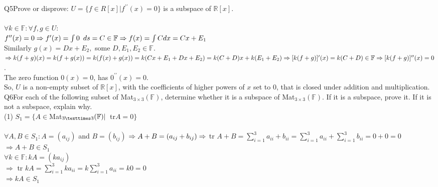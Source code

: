 \documentclass{article}
\begin{document}
Q5\quad Prove or disprove:
$U = \{f ∈ R[x] | f^{\prime\prime}(x)= 0\}$
is a subspace of $\mathbb{R}[x]$.\\

\\
$\forall k \in \mathbb{F}: \forall f,g \in U:$\\
$f^{\prime\prime}(x)= 0 \Rightarrow f^{\prime}(x) = \int 0\enskip ds =
C \in \mathbb{F} \Rightarrow f(x) = \int C dx = Cx + E_1 $\\
Similarly $g(x) = Dx +E_2,$ some $ D,E_1,E_2 \in \mathbb{F}$.\\

$\Rightarrow k(f+g) (x) = k(f+g(x)) = k(f(x) +g(x))
\\ = k(Cx + E_1 + Dx + E_2) = k(C+D) x +k(E_1 + E_2)\\ \Rightarrow
[k(f+g)]^{\prime} (x) = k(C+D) \in \mathbb{F} \Rightarrow
[k(f+g)]^{\prime\prime}(x) = 0$.\\

The zero function $0(x) = 0$, has $0^{\prime\prime}(x) = 0$.\\

So, $U$ is a non-empty subset of $\mathbb{R}[x]$, with the
coefficients of higher powers of $x$ set to $0$, that is closed under
addition and multiplication.\blacksquare\\
\newpage
Q6\quad For each of the following subset of Mat$_{3×3}(\mathbb{F})$, determine whether
it is a subspace of Mat$_{3×3}(\mathbb{F})$. If it is a subspace,
prove it. If it is not a subspace, explain why.\\

(1) $S_1 = \{A \in $Mat$_{3×3}(\mathbb{F}) |\enskip $tr$ A = 0\}$\\

\\
$\forall A,B \in S_1: A = (a_{ij})$ and $B = (b_{ij})$
$\Rightarrow A + B = (a_{ij} + b_{ij}) \\
\Rightarrow$ tr $A + B =  \sum_{i=1}^3 a_{ii} + b_{ii} = \sum_{i=1}^3
a_{ii} + \sum_{i=1}^3 b_{ii} = 0 + 0 = 0$\\
$\Rightarrow A + B \in S_1$\\

$\forall k \in \mathbb{F}: kA = (ka_{ij})$\\
$\Rightarrow$  tr $kA = \sum_{i=1}^3 ka_{ii} = k\sum_{i=1}^3 a_{ii} =
k0 = 0$\\
$\Rightarrow kA \in S_1$\\
\end{document}
